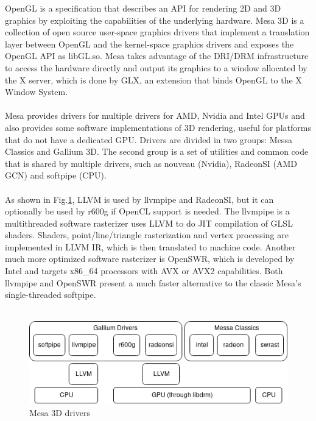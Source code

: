 \documentclass[12pt,a4paper,oneside]{article}
\begin{document}
OpenGL is a specification that describes an API for rendering 2D and 3D graphics
by exploiting the capabilities of the underlying hardware. Mesa 3D is a collection
of open source user-space graphics drivers that implement a translation layer
between OpenGL and the kernel-space graphics drivers and exposes the OpenGL API
as libGL.so. Mesa takes advantage of the  DRI/DRM infrastructure to access the
hardware directly and output its graphics to a window allocated by the X server,
which is done by GLX, an extension that binds OpenGL to the X Window System.
\\\\ Mesa provides drivers for multiple drivers for AMD, Nvidia and Intel GPUs
and also provides some software implementations of 3D rendering, useful for
platforms that do not have a dedicated GPU. Drivers are divided in two groups:
Messa Classics and Gallium 3D. The second group is a set of utilities and
common code that is shared by multiple drivers, such as nouveau (Nvidia),
RadeonSI (AMD GCN) and softpipe (CPU).\\\\
As shown in Fig.\ref{fig:mesa_drivers}, LLVM is used by llvmpipe and RadeonSI,
but it can optionally be used by r600g if OpenCL support is needed. The llvmpipe
is a multithreaded software rasterizer uses LLVM to do JIT compilation of GLSL shaders.
Shaders, point/line/triangle rasterization and vertex processing are implemented
in LLVM IR, which is then translated to machine code. Another much more optimized
software rasterizer is OpenSWR, which is developed by Intel and targets x86\_64
processors with AVX or AVX2 capabilities. Both llvmpipe and OpenSWR present a
much faster alternative to the classic Mesa's single-threaded softpipe.\\\\

\begin{figure}[H]
\centering
  \includegraphics[scale=0.70]{img/mesa_drivers.png}
  \caption{Mesa 3D drivers}
  \label{fig:mesa_drivers}
\end{figure}
\end{document}
